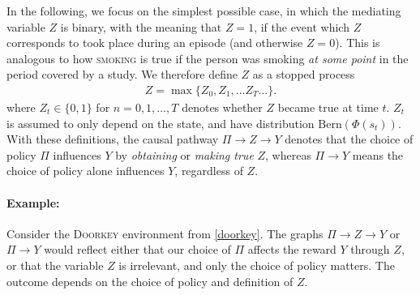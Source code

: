 \documentclass[letterpaper]{article} %
\newcommand{\doorkey}{\textsc{Doorkey}\xspace}
\begin{document}
	In the following, we focus on the simplest possible case, in which the mediating variable $Z$ is binary,
	with the meaning that $Z=1$, if the event which $Z$ corresponds to took place during an episode (and otherwise $Z=0$). This is analogous to how \textsc{smoking} is true if the person was smoking \emph{at some point} in the period covered by a study. We therefore define $Z$ as a stopped process
	\begin{align}
		Z = \max\{Z_0, Z_1, \dots Z_T\dots\}.
	\end{align}
	where $Z_t \in \{0,1\}$ for $n=0,1,\dots,T$ denotes
	whether $Z$ became true at time $t$. $Z_t$ is assumed to only depend on the state, and have distribution $\textrm{Bern}\left( \Phi(s_t) \right)$. %
	With these definitions, the causal pathway $\Pi \rightarrow Z \rightarrow Y$ denotes that the choice of policy $\Pi$ influences $Y$ by \emph{obtaining} or \emph{making true} $Z$, whereas $\Pi \rightarrow Y$ means the choice of policy alone influences $Y$, regardless of $Z$.

	\paragraph{Example: }
	Consider the \doorkey environment from \cref{doorkey}. The graphs $\Pi \rightarrow Z \rightarrow Y$ or $\Pi \rightarrow Y$ would reflect either that our choice of $\Pi$ affects the reward $Y$ through $Z$, or that the variable $Z$ is irrelevant, and only the choice of policy matters. The outcome depends on the choice of policy and definition of $Z$. %
\end{document}
